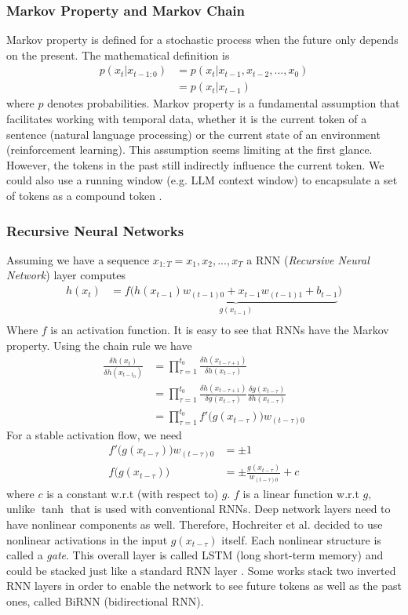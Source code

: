 \documentclass{article}
\begin{document}
\subsubsection{Markov Property and Markov Chain}
Markov property is defined for a stochastic process when the future only depends on the present. The mathematical definition is
\begin{align}
    p(x_t|x_{t-1:0}) &= p(x_t|x_{t-1},x_{t-2},...,x_0)\\
    &= p(x_t|x_{t-1})
\end{align}
where $p$ denotes probabilities. Markov property is a fundamental assumption that facilitates working with temporal data, whether it is the current token of a sentence (natural language processing) or the current state of an environment (reinforcement learning). This assumption seems limiting at the first glance. However, the tokens in the past still indirectly influence the current token. We could also use a running window (e.g. LLM context window) to encapsulate a set of tokens as a compound token \cite{karaca_ai-book_2024}.
\subsubsection{Recursive Neural Networks}
Assuming we have a sequence $x_{1:T} = x_1, x_2, ..., x_T$ a RNN (\textit{Recursive Neural Network}) layer computes
\begin{align}
    h(x_t) &= f\big(\underbrace{h(x_{t-1})w_{(t-1)0} + x_{t-1}w_{(t-1)1} + b_{t-1}}_{g(x_{t-1})}\big)\\
\end{align}
Where $f$ is an activation function. It is easy to see that RNNs have the Markov property. Using the chain rule we have
\begin{align}
    \frac{\delta h(x_t)}{\delta h(x_{t-t_0})}
    &= \prod_{\tau=1}^{t_0}\frac{\delta h(x_{t-\tau+1})}{\delta h(x_{t-\tau})}\\
    &= \prod_{\tau=1}^{t_0}\frac{\delta h(x_{t-\tau+1})}{\delta g(x_{t-\tau})}\frac{\delta g(x_{t-\tau})}{\delta h(x_{t-\tau})}\\
    &= \prod_{\tau=1}^{t_0}f'\Big(g(x_{t-\tau})\Big)w_{(t-\tau)0}
\end{align}
For a stable activation flow, we need
\begin{align}
    f'\Big(g(x_{t-\tau})\Big)w_{(t-\tau)0} &= \pm 1\\
    f\Big(g(x_{t-\tau})\Big) &= \pm \frac{g(x_{t-\tau})}{w_{(t-\tau)0}} + c
\end{align}
where $c$ is a constant w.r.t (with respect to) $g$. $f$ is a linear function w.r.t $g$, unlike $\tanh$ that is used with conventional RNNs. Deep network layers need to have nonlinear components as well. Therefore, Hochreiter et al. decided to use nonlinear activations in the input $g(x_{t-\tau})$ itself. Each nonlinear structure is called a \textit{gate}. This overall layer is called LSTM (long short-term memory) and could be stacked just like a standard RNN layer \cite{hochreiter_long_1997}. Some works stack two inverted RNN layers in order to enable the network to see future tokens as well as the past ones, called BiRNN (bidirectional RNN).
\end{document}
